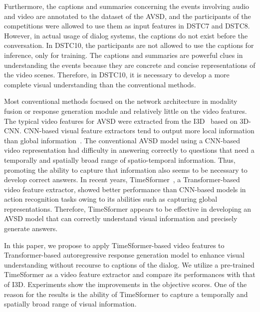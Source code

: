 \documentclass[letterpaper]{article} %
\begin{document}
Furthermore, the captions and summaries concerning the events involving audio and video are annotated to the dataset of the AVSD, and the participants of the competitions were allowed to use them as input features in DSTC7 and DSTC8.
However, in actual usage of dialog systems, the captions do not exist before the conversation.
In DSTC10, the participants are not allowed to use the captions for inference, only for training.
%
The captions and summaries are powerful clues in understanding the events because they are concrete and concise representations of the video scenes.
Therefore, in DSTC10, it is necessary to develop a more complete visual understanding than the conventional methods.

Most conventional methods focused on the network architecture in modality fusion or response generation module and relatively little on the video features.
The typical video features for AVSD were extracted from the I3D~\cite{Carreira2017quo} based on 3D-CNN.
CNN-based visual feature extractors tend to output more local information than global information~\cite{Raghu2021vision}.
The conventional AVSD model using a CNN-based video representation had difficulty in answering correctly to questions that need a temporally and spatially broad range of spatio-temporal information.
Thus, promoting the ability to capture that information also seems to be necessary to develop correct answers.
In recent years, TimeSformer~\cite{Bertasius2021is}, a Transformer-based video feature extractor, showed better performance than CNN-based models in action recognition tasks owing to its abilities such as capturing global representations.
Therefore, TimeSformer appears to be effective in developing an AVSD model that can correctly understand visual information and precisely generate answers.

In this paper, we propose to apply TimeSformer-based video features to Transformer-based autoregressive response generation model to enhance visual understanding without recourse to captions of the dialog.
We utilize a pre-trained TimeSformer as a video feature extractor and compare its performances with that of I3D.
Experiments show the improvements in the objective scores.
One of the reason for the results is the ability of TimeSformer to capture a temporally and spatially broad range of visual information.
\end{document}
